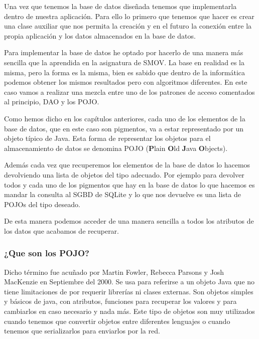 Una vez que tenemos la base de datos diseñada tenemos que implementarla dentro de nuestra aplicación. Para ello lo primero que tenemos que hacer es crear una clase auxiliar que nos permita la creación y en el futuro la conexión entre la propia aplicación y los datos almacenados en la base de datos. 

Para implementar la base de datos he optado por hacerlo de una manera más sencilla que la aprendida en la asignatura de SMOV. La base en realidad es la misma, pero la forma es la misma, bien es sabido que dentro de la informática podemos obtener los mismos resultados pero con algoritmos diferentes. En este caso vamos a realizar una mezcla entre uno de los patrones de acceso comentados al principio, DAO y los POJO.

Como hemos dicho en los capítulos anteriores, cada uno de los elementos de la base de datos, que en este caso son pigmentos, va a estar representado por un objeto típico de Java. Esta forma de representar los objetos para el almacenamiento de datos se denomina POJO (\textbf{P}lain \textbf{O}ld \textbf{J}ava \textbf{O}bjects).

Además cada vez que recuperemos los elementos de la base de datos lo hacemos devolviendo una lista de objetos del tipo adecuado. Por ejemplo para devolver todos y cada uno de los pigmentos que hay en la base de datos lo que hacemos es mandar la consulta al SGBD de SQLite y lo que nos devuelve es una lista de POJOs del tipo deseado. 

De esta manera podemos acceder de una manera sencilla a todos los atributos de los datos que acabamos de recuperar.

\subsubsection{¿Que son los POJO?} 

Dicho término \cite{pojo} fue acuñado por Martin Fowler, Rebecca Parsons y Josh MacKenzie en Septiembre del 2000. Se usa para referirse a un objeto Java que no tiene limitaciones de por requerir librerías ni clases externas. Son objetos simples y básicos de java, con atributos, funciones para recuperar los valores y para cambiarlos en caso necesario y nada más. Este tipo de objetos son muy utilizados cuando tenemos que convertir objetos entre diferentes lenguajes o cuando tenemos que serializarlos para enviarlos por la red. 

